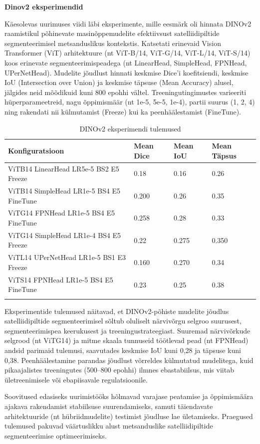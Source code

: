 \textbf{Dinov2 eksperimendid}

Käesolevas uurimuses viidi läbi eksperimente, mille eesmärk oli hinnata DINOv2
raamistikul põhinevate masinõppemudelite efektiivsust satelliidipiltide
segmenteerimisel metsanduslikus kontekstis. Katsetati erinevaid Vision
Transformer (ViT) arhitektuure (nt ViT-B/14, ViT-G/14, ViT-L/14, ViT-S/14) koos
erinevate segmenteerimispeadega (nt LinearHead, SimpleHead, FPNHead,
UPerNetHead). Mudelite jõudlust hinnati keskmise Dice'i koefitsiendi, keskmise
IoU (Intersection over Union) ja keskmise täpsuse (Mean Accuracy) alusel,
jälgides neid mõõdikuid kuni 800 epohhi vältel. Treeningutingimustes varieeriti
hüperparameetreid, nagu õppimismäär (nt 1e-5, 5e-5, 1e-4), partii suurus (1, 2,
4) ning rakendati nii külmutamist (Freeze) kui ka peenhäälestamist (FineTune).

\bigskip
\begin{longtable}{llll}
    \textbf{Konfiguratsioon} & \textbf{Mean Dice} & \textbf{Mean IoU} & \textbf{Mean Täpsus} \\
    \hline
    ViTB14 LinearHead LR5e-5 BS2 E5 Freeze & 0.18 & 0.16 & 0.26 \\
    ViTB14 SimpleHead LR1e-5 BS4 E5 FineTune & 0.200 & 0.26 & 0.35 \\
    ViTG14 FPNHead LR1e-5 BS4 E5 FineTune & 0.258 & 0.28 & 0.33 \\
    ViTG14 SimpleHead LR1e-4 BS4 E5 Freeze & 0.22 & 0.275 & 0.350 \\
    ViTL14 UPerNetHead LR1e-5 BS1 E3 Freeze & 0.160 & 0.270 & 0.34 \\
    ViTS14 FPNHead LR1e-5 BS4 E5 FineTune & 0.23 & 0.25 & 0.38 \\
    \hline
    \caption{DINOv2 eksperimendi tulemused}
    \label{tab:dinov2_results}
\end{longtable}
\bigskip

Eksperimentide tulemused näitavad, et DINOv2-põhiste mudelite jõudlus satelliidipiltide segmenteerimisel sõltub oluliselt närvivõrgu selgroo suurusest, segmenteerimispea keerukusest ja treeningustrateegiast. Suuremad närvivõrkude selgrood (nt ViTG14) ja mitme skaala tunnuseid töötlevad pead (nt FPNHead) andsid parimaid tulemusi, saavutades keskmise IoU kuni 0,28 ja täpsuse kuni 0,38. Peenhäälestamine parandas jõudlust võrreldes külmutatud mudelitega, kuid pikaajalistes treeningutes (500–800 epohhi) ilmnes ebastabiilsus, mis viitab ületreenimisele või ebapiisavale regulatsioonile.

Soovitused edasiseks uurimistööks hõlmavad varajase peatamise ja õppimismäära ajakava rakendamist stabiilsuse suurendamiseks, samuti täiendavate arhitektuuride (nt hübriidmudelite) testimist jõudluse lae ületamiseks. Praegused tulemused pakuvad väärtuslikku alust metsanduslike satelliidipiltide segmenteerimise optimeerimiseks.

